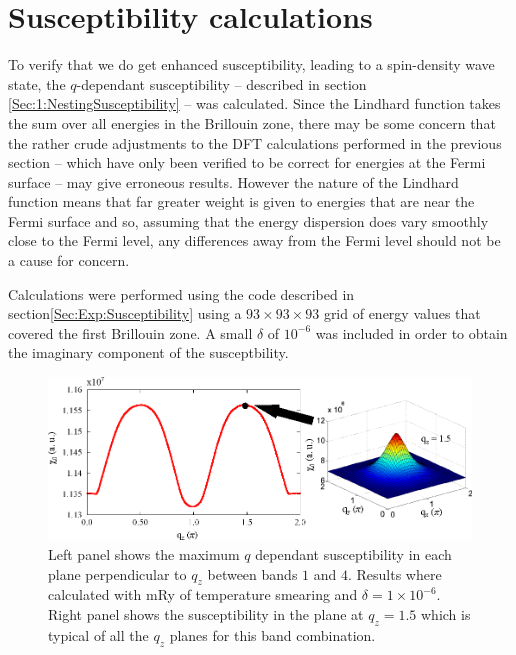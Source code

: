 
\section{Susceptibility calculations}
    \label{Sec:ResD:SubsceptibilityCalculation}

To verify that we do get enhanced susceptibility, leading to a spin-density wave state, the $q$-dependant susceptibility -- described in section \ref{Sec:1:NestingSusceptibility} -- was calculated. Since the Lindhard function takes the sum over all energies in the Brillouin zone, there may be some concern that the rather crude adjustments to the DFT calculations performed in the previous section -- which have only been verified to be correct for energies at the Fermi surface -- may give erroneous results. However the nature of the Lindhard function means that far greater weight is given to energies that are near the Fermi surface and so, assuming that the energy dispersion does vary smoothly close to the Fermi level, any differences away from the Fermi level should not be a cause for concern.  

Calculations were performed using the  code described in section\ref{Sec:Exp:Susceptibility} using a $93\times93\times93$ grid of energy values that covered the first Brillouin zone. A small $\delta$ of $10^{-6}$ was included in order to obtain the imaginary component of the susceptbility.

\begin{figure}[htbp]
    \begin{center}
        \includegraphics[scale=0.9]{Chapter-dHvABaFe2P2/Figures/AngleDepMeasurements/SusceptibilityEnhancement/SusceptibilityEnhancement}
        \caption{Left panel shows the maximum $q$ dependant susceptibility in each plane perpendicular to $q_z$ between bands $1$ and $4$. Results where calculated with \unit[1]{mRy} of temperature smearing and $\delta=1\times10^{-6}$. Right panel shows the susceptibility in the plane at $q_z=1.5$ which is typical of all the $q_z$ planes for this band combination.}
        \label{Fig:ResD:SusceptbilityEnhancement}
    \end{center}
\end{figure}

